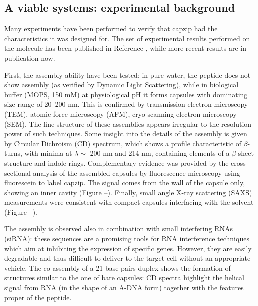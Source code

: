 
\subsection{A viable systems: experimental background}
Many experiments have been performed to verify that capzip had the characteristics it was designed for. The set of experimental results performed on the molecule has been published in Reference \cite{Castelletto2016}, while more recent results are in publication now.

First, the assembly ability have been tested: in pure water, the peptide does not show assembly (as verified by Dynamic Light Scattering), while in biological buffer (MOPS, 150 mM) at physiological pH it forms capsules with dominating size range of 20–200 nm. This is confirmed by transmission electron microscopy (TEM), atomic force microscopy (AFM), cryo-scanning electron microscopy (SEM).
%
The fine structure of these assemblies appears irregular to the resolution power of such techniques. Some insight into the details of the assembly is given by Circular Dichroism (CD) spectrum, which shows a profile characteristic of $\beta$-turns, with minima at $\lambda \sim$ 200 nm and 214 nm, containing elements of a $\beta$-sheet structure and indole rings.
%
Complementary evidence was provided by the cross-sectional analysis of the assembled capsules by fluorescence microscopy using fluorescein to label capzip. The signal comes from the wall of the capsule only, showing an inner cavity (Figure --).
%
Finally, small angle X-ray scattering (SAXS) measurements were consistent with compact capsules interfacing with the solvent (Figure --).

The assembly is observed also in combination with small interfering RNAs (siRNA): these sequences are a promising tools for RNA interference techniques which aim at inhibiting the expression of specific genes. However, they are easily degradable and thus difficult to deliver to the target cell without an appropriate vehicle.
%
The co-assembly of a 21 base pairs duplex shows the formation of structures similar to the one of bare capsules: CD spectra highlight the helical signal from RNA (in the shape of an A-DNA form) together with the features proper of the peptide.

